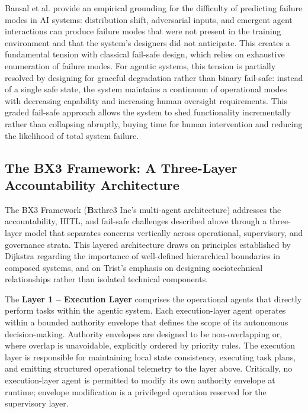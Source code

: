 Bansal et al. \cite{bansal2019} provide an empirical grounding for the difficulty of predicting failure modes in AI systems: distribution shift, adversarial inputs, and emergent agent interactions can produce failure modes that were not present in the training environment and that the system's designers did not anticipate. This creates a fundamental tension with classical fail-safe design, which relies on exhaustive enumeration of failure modes. For agentic systems, this tension is partially resolved by designing for graceful degradation rather than binary fail-safe: instead of a single safe state, the system maintains a continuum of operational modes with decreasing capability and increasing human oversight requirements. This graded fail-safe approach allows the system to shed functionality incrementally rather than collapsing abruptly, buying time for human intervention and reducing the likelihood of total system failure.

\subsection{The BX3 Framework: A Three-Layer Accountability Architecture}

The BX3 Framework (\textbf{B}xthre3 Inc's multi-agent architecture) addresses the accountability, HITL, and fail-safe challenges described above through a three-layer model that separates concerns vertically across operational, supervisory, and governance strata. This layered architecture draws on principles established by Dijkstra \cite{dijkstra1982} regarding the importance of well-defined hierarchical boundaries in composed systems, and on Trist's emphasis \cite{tristr81} on designing sociotechnical relationships rather than isolated technical components.

The \textbf{Layer 1 -- Execution Layer} comprises the operational agents that directly perform tasks within the agentic system. Each execution-layer agent operates within a bounded authority envelope that defines the scope of its autonomous decision-making. Authority envelopes are designed to be non-overlapping or, where overlap is unavoidable, explicitly ordered by priority rules. The execution layer is responsible for maintaining local state consistency, executing task plans, and emitting structured operational telemetry to the layer above. Critically, no execution-layer agent is permitted to modify its own authority envelope at runtime; envelope modification is a privileged operation reserved for the supervisory layer.

